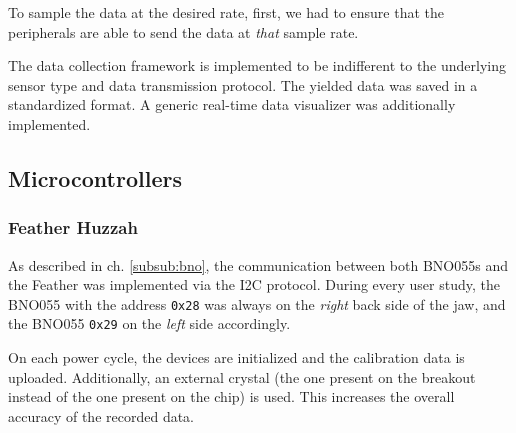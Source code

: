 To sample the data at the desired rate, first, we had to ensure that the peripherals are able to send the data at \emph{that} sample rate. 

The data collection framework is implemented to be indifferent to the underlying sensor type and data transmission protocol. The yielded data was saved in a standardized format. A generic real-time data visualizer was additionally implemented.

\subsection{Microcontrollers}

\subsubsection{Feather Huzzah}
\label{subsub:feather}

As described in ch. \ref{subsub:bno}, the communication between both BNO055s and the Feather was implemented via the I2C protocol. During every user study, the BNO055 with the address \texttt{0x28} was always on the \emph{right} back side of the jaw, and the BNO055 \texttt{0x29} on the \emph{left} side accordingly.




On each power cycle, the devices are initialized and the calibration data is uploaded. Additionally, an external crystal (the one present on the breakout instead of the one present on the chip) is used. This increases the overall accuracy of the recorded data.

